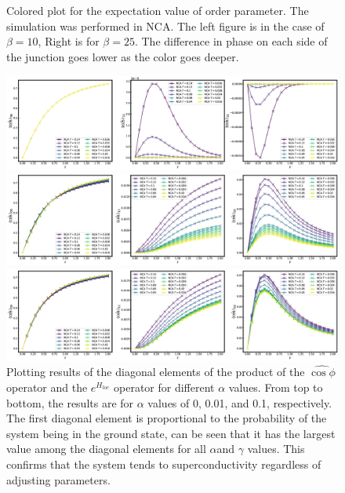 \documentclass{article}[12pt]
\begin{document}
\begin{spacing}{1.5}
\begin{figure}[htbp]
  \caption{Colored plot for the expectation value of order parameter. The simulation was performed in NCA. The left figure is in the case of $\beta=10$, Right is for $\beta=25$.
  The difference in phase on each side of the junction goes lower as the color goes deeper.}
\end{figure}
\begin{figure}[htbp]
  \centerline{\includegraphics[width=17cm]{TexFigure/Matele_Ns3_alp0.png}}
  \centerline{\includegraphics[width=17cm]{TexFigure/Matele_Ns3_alp0_1.png}}
  \centerline{\includegraphics[width=17cm]{TexFigure/Matele_Ns3_alp1.png}}
  \caption{Plotting results of the diagonal elements of the product of the $\hat{\cos\phi}$ operator and the  
  $e^{H_{loc}}$ operator for different $\alpha$ values. From top to bottom, the results are for $\alpha$ 
  values of 0, 0.01, and 0.1, respectively. The first diagonal element is proportional to the probability of 
  the system being in the ground state, can be seen that it has the largest value among the diagonal elements 
  for all $\alpha $and $\gamma$ values. This confirms that the system tends to superconductivity regardless of 
  adjusting parameters.}
\end{figure}
\pagebreak

\end{spacing}
\end{document}
